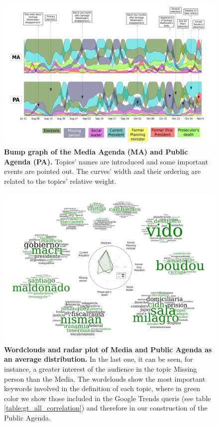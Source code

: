 \begin{landscape}
\begin{figure}[h]
\includegraphics[height = \textheight]{images/Fig1.pdf}
\caption{\textbf{Bump graph of the Media Agenda (MA) and Public Agenda (PA).} Topics’ names are introduced and some important events are pointed out. The curves’ width and their ordering are related to the topics’ relative weight.}
\label{fig:all_agenda}
\end{figure}
\end{landscape}

\begin{figure}[h]
\centering
\includegraphics[width = \textwidth]{images/Fig2.pdf}
\caption{\textbf{Wordclouds and radar plot of Media and Public Agenda as an average distribution.}
In the last one, it can be seen, for instance, a greater interest of the audience in the topic Missing person than the Media. 
The wordclouds show the most important keywords involved in the definition of each topic, where in green color we show those included in the Google Trends queris (see table \ref{table:gt_all_correlation}) and therefore in our construction of the Public Agenda.
}
\label{fig:topics_wordclouds}
\end{figure}

